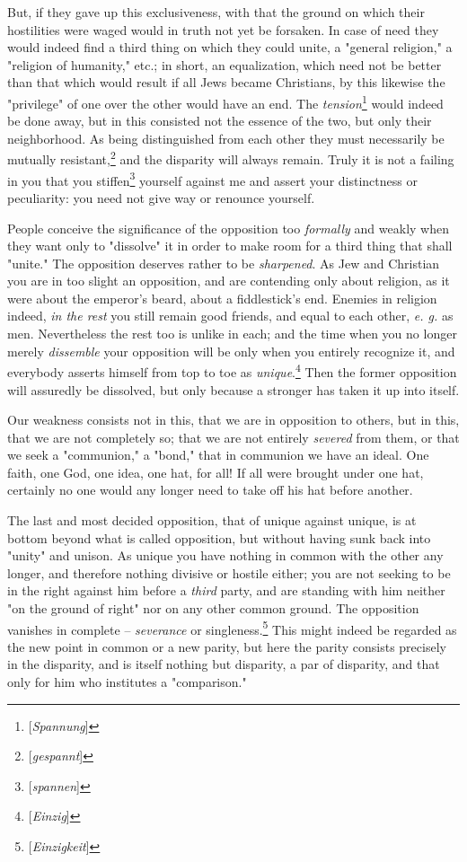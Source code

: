 But, if they gave up this exclusiveness, with that the ground on which their 
hostilities were waged would in truth not yet be forsaken. In case of need 
they would indeed find a third thing on which they could unite, a "{}general 
religion,"{} a "{}religion of humanity,"{} etc.; in short, an equalization, 
which need not be better than that which would result if all Jews became 
Christians, by this likewise the "{}privilege"{} of one over the other would 
have an end. The \textit{tension}\footnote{[\textit{Spannung}]} would indeed 
be done away, but in this consisted not the essence of the two, but only their 
neighborhood. As being distinguished from each other they must necessarily be 
mutually resistant,\footnote{[\textit{gespannt}]} and the disparity will 
always remain. Truly it is not a failing in you that you 
stiffen\footnote{[\textit{spannen}]} yourself against me and assert your 
distinctness or peculiarity: you need not give way or renounce yourself.

People conceive the significance of the opposition too \textit{formally} and 
weakly when they want only to "{}dissolve"{} it in order to make room for a 
third thing that shall "{}unite."{} The opposition deserves rather to be 
\textit{sharpened}. As Jew and Christian you are in too slight an opposition, 
and are contending only about religion, as it were about the emperor's beard, 
about a fiddlestick's end. Enemies in religion indeed, \textit{in the rest} 
you still remain good friends, and equal to each other, \textit{e. g.} as men. 
Nevertheless the rest too is unlike in each; and the time when you no longer 
merely \textit{dissemble} your opposition will be only when you entirely 
recognize it, and everybody asserts himself from top to toe as 
\textit{unique}.\footnote{[\textit{Einzig}]} Then the former opposition will 
assuredly be dissolved, but only because a stronger has taken it up into 
itself.

Our weakness consists not in this, that we are in opposition to others, but in 
this, that we are not completely so; that we are not entirely \textit{severed} 
from them, or that we seek a "{}communion,"{} a "{}bond,"{} that in communion 
we have an ideal. One faith, one God, one idea, one hat, for all! If all were 
brought under one hat, certainly no one would any longer need to take off his 
hat before another.

The last and most decided opposition, that of unique against unique, is at 
bottom beyond what is called opposition, but without having sunk back into 
"{}unity"{} and unison. As unique you have nothing in common with the other 
any longer, and therefore nothing divisive or hostile either; you are not 
seeking to be in the right against him before a \textit{third} party, and are 
standing with him neither "{}on the ground of right"{} nor on any other common 
ground. The opposition vanishes in complete -- \textit{severance} or 
singleness.\footnote{[\textit{Einzigkeit}]} This might indeed be regarded as 
the new point in common or a new parity, but here the parity consists 
precisely in the disparity, and is itself nothing but disparity, a par of 
disparity, and that only for him who institutes a "{}comparison."{}

